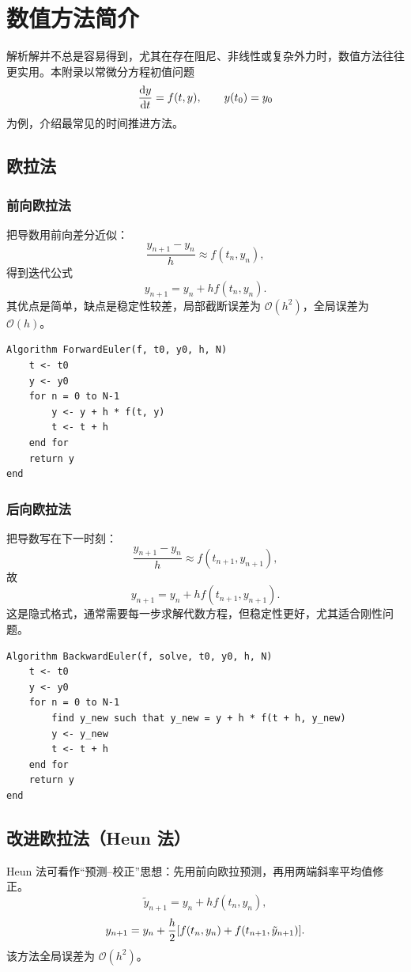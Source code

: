 \chapter{数值方法简介}

解析解并不总是容易得到，尤其在存在阻尼、非线性或复杂外力时，数值方法往往更实用。本附录以常微分方程初值问题
\[
\dv{y}{t}=f(t,y),\qquad y(t_0)=y_0
\]
为例，介绍最常见的时间推进方法。

\section{欧拉法}

\subsection{前向欧拉法}
把导数用前向差分近似：
\[
\frac{y_{n+1}-y_n}{h}\approx f(t_n,y_n),
\]
得到迭代公式
\[
 y_{n+1}=y_n+h f(t_n,y_n).
\]
其优点是简单，缺点是稳定性较差，局部截断误差为 $\mathcal{O}(h^2)$，全局误差为 $\mathcal{O}(h)$。

\begin{lstlisting}
Algorithm ForwardEuler(f, t0, y0, h, N)
    t <- t0
    y <- y0
    for n = 0 to N-1
        y <- y + h * f(t, y)
        t <- t + h
    end for
    return y
end
\end{lstlisting}

\subsection{后向欧拉法}
把导数写在下一时刻：
\[
\frac{y_{n+1}-y_n}{h}\approx f(t_{n+1},y_{n+1}),
\]
故
\[
 y_{n+1}=y_n+h f(t_{n+1},y_{n+1}).
\]
这是隐式格式，通常需要每一步求解代数方程，但稳定性更好，尤其适合刚性问题。

\begin{lstlisting}
Algorithm BackwardEuler(f, solve, t0, y0, h, N)
    t <- t0
    y <- y0
    for n = 0 to N-1
        find y_new such that y_new = y + h * f(t + h, y_new)
        y <- y_new
        t <- t + h
    end for
    return y
end
\end{lstlisting}

\section{改进欧拉法（Heun 法）}
Heun 法可看作“预测--校正”思想：先用前向欧拉预测，再用两端斜率平均值修正。
\[
\tilde y_{n+1}=y_n+h f(t_n,y_n),
\]
\[
 y_{n+1}=y_n+\frac{h}{2}\qty[f(t_n,y_n)+f(t_{n+1},\tilde y_{n+1})].
\]
该方法全局误差为 $\mathcal{O}(h^2)$。

